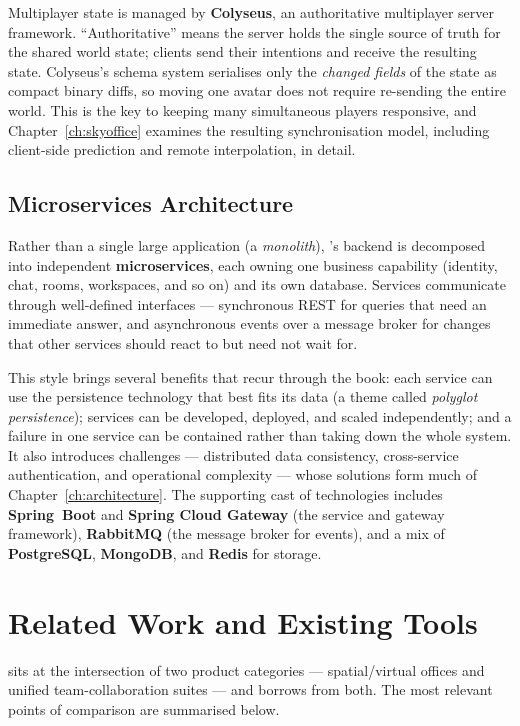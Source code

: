 Multiplayer state is managed by \textbf{Colyseus}, an authoritative multiplayer
server framework. ``Authoritative'' means the server holds the single source of
truth for the shared world state; clients send their intentions and receive the
resulting state. Colyseus's schema system serialises only the \emph{changed
fields} of the state as compact binary diffs, so moving one avatar does not
require re-sending the entire world. This is the key to keeping many simultaneous
players responsive, and Chapter~\ref{ch:skyoffice} examines the resulting
synchronisation model, including client-side prediction and remote interpolation,
in detail.

\subsection{Microservices Architecture}

Rather than a single large application (a \emph{monolith}), \voname{}'s backend
is decomposed into independent \textbf{microservices}, each owning one business
capability (identity, chat, rooms, workspaces, and so on) and its own database.
Services communicate through well-defined interfaces --- synchronous REST for
queries that need an immediate answer, and asynchronous events over a message
broker for changes that other services should react to but need not wait for.

This style brings several benefits that recur through the book: each service can
use the persistence technology that best fits its data (a theme called
\emph{polyglot persistence}); services can be developed, deployed, and scaled
independently; and a failure in one service can be contained rather than taking
down the whole system. It also introduces challenges --- distributed data
consistency, cross-service authentication, and operational complexity --- whose
solutions form much of Chapter~\ref{ch:architecture}. The supporting cast of
technologies includes \textbf{Spring~Boot} and \textbf{Spring Cloud Gateway}
(the service and gateway framework), \textbf{RabbitMQ} (the message broker for
events), and a mix of \textbf{PostgreSQL}, \textbf{MongoDB}, and \textbf{Redis}
for storage.

\section{Related Work and Existing Tools}

\voname{} sits at the intersection of two product categories --- spatial/virtual
offices and unified team-collaboration suites --- and borrows from both. The
most relevant points of comparison are summarised below.


